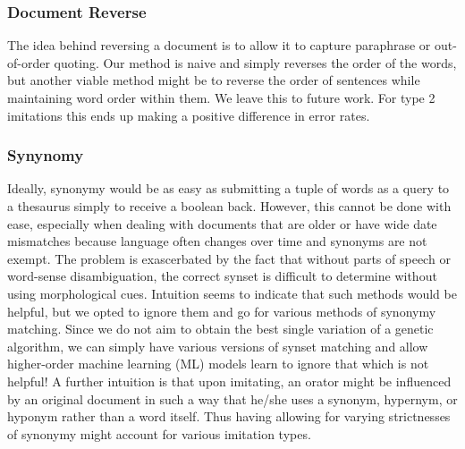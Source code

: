 
\subsubsection{Document Reverse}
The idea behind reversing a document is to allow it to capture paraphrase or out-of-order quoting. Our method is naive and simply reverses the order of the words, but another viable method might be to reverse the order of sentences while maintaining word order within them. We leave this to future work. For type 2 imitations this ends up making a positive difference in error rates.



\subsubsection{Synynomy}
Ideally, synonymy would be as easy as submitting a tuple of words as a query to a thesaurus simply to receive a boolean back. However, this cannot be done with ease, especially when dealing with documents that are older or have wide date mismatches because language often changes over time and synonyms are not exempt. The problem is exascerbated by the fact that without parts of speech or word-sense disambiguation, the correct synset is difficult to determine without using morphological cues. Intuition seems to indicate that such methods would be helpful, but we opted to ignore them and go for various methods of synonymy matching. Since we do not aim to obtain the best single variation of a genetic algorithm, we can simply have various versions of synset matching and allow higher-order machine learning (ML) models learn to ignore that which is not helpful! A further intuition is that upon imitating, an orator might be influenced by an original document in such a way that he/she uses a synonym, hypernym, or hyponym rather than a word itself. Thus having allowing for varying strictnesses of synonymy might account for various imitation types.

